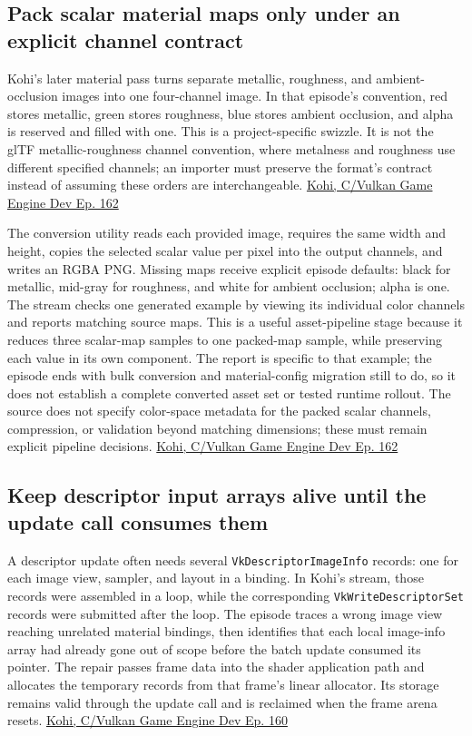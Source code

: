 \subsection{Pack scalar material maps only under an explicit channel contract}\label{06-engine-ii-ch026-pack-scalar-material-maps-only-under-an-explicit-channel-contract}

Kohi's later material pass turns separate metallic, roughness, and ambient-occlusion images into one four-channel image. In that episode's convention, red stores metallic, green stores roughness, blue stores ambient occlusion, and alpha is reserved and filled with one. This is a project-specific swizzle. It is not the glTF metallic-roughness channel convention, where metalness and roughness use different specified channels; an importer must preserve the format's contract instead of assuming these orders are interchangeable. \href{https://www.youtube.com/watch?v=C2zceJ88k7w}{Kohi, C/Vulkan Game Engine Dev Ep. 162}

The conversion utility reads each provided image, requires the same width and height, copies the selected scalar value per pixel into the output channels, and writes an RGBA PNG. Missing maps receive explicit episode defaults: black for metallic, mid-gray for roughness, and white for ambient occlusion; alpha is one. The stream checks one generated example by viewing its individual color channels and reports matching source maps. This is a useful asset-pipeline stage because it reduces three scalar-map samples to one packed-map sample, while preserving each value in its own component. The report is specific to that example; the episode ends with bulk conversion and material-config migration still to do, so it does not establish a complete converted asset set or tested runtime rollout. The source does not specify color-space metadata for the packed scalar channels, compression, or validation beyond matching dimensions; these must remain explicit pipeline decisions. \href{https://www.youtube.com/watch?v=C2zceJ88k7w}{Kohi, C/Vulkan Game Engine Dev Ep. 162}

\subsection{Keep descriptor input arrays alive until the update call consumes them}\label{06-engine-ii-ch026-keep-descriptor-input-arrays-alive-until-the-update-call-consumes-them}

A descriptor update often needs several \texttt{VkDescriptorImageInfo} records: one for each image view, sampler, and layout in a binding. In Kohi's stream, those records were assembled in a loop, while the corresponding \texttt{VkWriteDescriptorSet} records were submitted after the loop. The episode traces a wrong image view reaching unrelated material bindings, then identifies that each local image-info array had already gone out of scope before the batch update consumed its pointer. The repair passes frame data into the shader application path and allocates the temporary records from that frame's linear allocator. Its storage remains valid through the update call and is reclaimed when the frame arena resets. \href{https://www.youtube.com/watch?v=Zcxl3BmmxJA}{Kohi, C/Vulkan Game Engine Dev Ep. 160}

